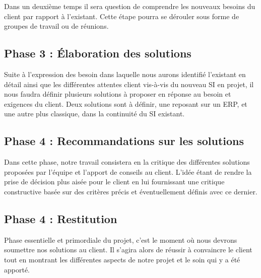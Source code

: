 Dans un deuxième temps il sera question de comprendre les nouveaux besoins du client par rapport à l’existant. Cette étape pourra se dérouler sous forme de groupes de travail ou de réunions.

\subsection{Phase 3 : Élaboration des solutions}

Suite à l’expression des besoin dans laquelle nous aurons identifié l’existant en détail ainsi que les différentes attentes client vis-à-vis du nouveau SI en projet, il nous faudra définir plusieurs solutions à proposer en réponse au besoin et exigences du client. Deux solutions sont à définir, une reposant sur un ERP, et une autre plus classique, dans la continuité du SI existant.

\subsection{Phase 4 : Recommandations sur les solutions}
 
Dans cette phase, notre travail consistera en la critique des différentes solutions proposées par l’équipe et l’apport de conseils au client. L’idée étant de rendre la prise de décision plus aisée pour le client en lui fournissant une critique constructive basée sur des critères précis et éventuellement définis avec ce dernier.

\subsection{Phase 4 : Restitution}

Phase essentielle et primordiale du projet, c’est le moment où nous devrons soumettre nos solutions au client. Il s'agira alors de  réussir à convaincre le client tout en montrant les différentes aspects de notre projet et le soin qui y a été apporté.
